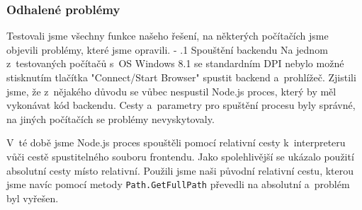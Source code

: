 \documentclass[12pt, a4paper, twoside]{article}
\makeatletter
\renewcommand\paragraph{%
	\@startsection{subparagraph}{5}{0mm}%
	{-\baselineskip}%
	{.1\baselineskip}%
	{\normalfont\normalsize\bfseries}}
\makeatother
\begin{document}
	\subsubsection{Odhalené problémy}
	Testovali jsme všechny funkce našeho řešení, na některých počítačích jsme objevili problémy, které jsme opravili.
	\paragraph{Spouštění backendu}
	Na jednom z~testovaných počítačů s~OS Windows 8.1 se standardním DPI nebylo možné stisknutím tlačítka "Connect/Start Browser" spustit backend a~prohlížeč. Zjistili jsme, že z~nějakého důvodu se vůbec nespustil Node.js proces, který by měl vykonávat kód backendu. Cesty a~parametry pro spuštění procesu byly správné, na jiných počítačích se problémy nevyskytovaly. 
	
	V~té době jsme Node.js proces spouštěli pomocí relativní cesty k~interpreteru vůči cestě spustitelného souboru frontendu. Jako spolehlivější se ukázalo použití absolutní cesty místo relativní. Použili jsme naši původní relativní cestu, kterou jsme navíc pomocí metody \texttt{Path.GetFullPath} převedli na absolutní a~problém byl vyřešen.
\end{document}
